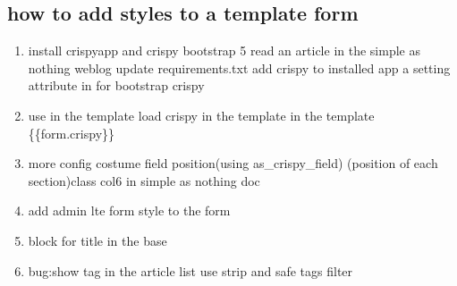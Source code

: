 \documentclass{article}
\begin{document}
		\subsection{how to add styles to a template form}
			\begin{enumerate}
				\item install crispyapp and crispy bootstrap 5
					\subitem read an article in the simple as nothing weblog 
					\subitem update requirements.txt
					\subitem add crispy to installed app 
					\subitem a setting attribute in for bootstrap crispy
				\item use in the template
					\subitem load crispy in the template
					\subitem in the template \{\{form.crispy\}\}
				\item more config
					\subitem costume field position(using as\_crispy\_field)
					\subitem (position of each section)class col6 in simple as nothing doc
				\item add admin lte form style to the form
				
				\item block for title in the base
				\item bug:show tag in the article list
					\subitem use strip and safe tags filter
					
			\end{enumerate}
%	
%	
	
\end{document}
